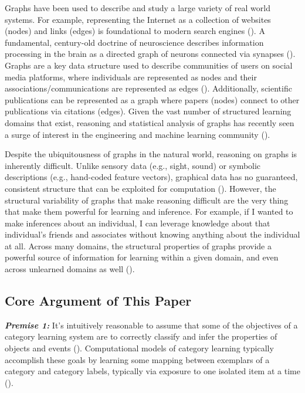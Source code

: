\documentclass[12pt]{article}
\let\oldcite=\cite
\renewcommand{\cite}[1]{\textcolor[rgb]{0, .121, .388}{\oldcite{#1}}}
\begin{document}
Graphs have been used to describe and study a large variety of real world systems. For example, representing the Internet as a collection of websites (nodes) and links (edges) is foundational to modern search engines (\cite{newman2003structure}). A fundamental, century-old doctrine of neuroscience describes information processing in the brain as a directed graph of neurons connected via synapses (\cite{bullock2005neuron}). Graphs are a key data structure used to describe communities of users on social media platforms, where individuals are represented as nodes and their associations/communications are represented as edges (\cite{arya2018exploiting}). Additionally, scientific publications can be represented as a graph where papers (nodes) connect to other publications via citations (edges). Given the vast number of structured learning domains that exist, reasoning and statistical analysis of graphs has recently seen a surge of interest in the engineering and machine learning community (\cite{bronstein2017geometric}).

Despite the ubiquitousness of graphs in the natural world, reasoning on graphs is inherently difficult. Unlike sensory data (e.g., sight, sound) or symbolic descriptions (e.g., hand-coded feature vectors), graphical data has no guaranteed, consistent structure that can be exploited for computation (\cite{bronstein2017geometric,wu2020comprehensive}). However, the structural variability of graphs that make reasoning difficult are the very thing that make them powerful for learning and inference. For example, if I wanted to make inferences about an individual, I can leverage knowledge about that individual's friends and associates without knowing anything about the individual at all. Across many domains, the structural properties of graphs provide a powerful source of information for learning within a given domain, and even across unlearned domains as well (\cite{graves2016hybrid}).

\subsection{Core Argument of This Paper}

\emph{\textbf{Premise 1:}} It's intuitively reasonable to assume that some of the objectives of a category learning system are to correctly classify and infer the properties of objects and events (\cite{markman2003category}). Computational models of category learning typically accomplish these goals by learning some mapping between exemplars of a category and category labels, typically via exposure to one isolated item at a time (\cite{nosofsky2011generalized,kruschke1992alcove,kurtz2015human,love2004sustain}).
\end{document}
